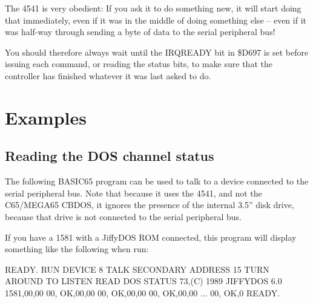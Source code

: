 The 4541 is very obedient: If you ask it to do something new, it
will start doing that immediately, even if it was in the middle of
doing something else -- even if it was half-way through sending a byte
of data to the serial peripheral bus!

You should therefore always wait until the IRQREADY bit in \$D697 is
set before issuing each command, or reading the status bits, to make
sure that the controller has finished whatever it was last asked to
do.

\section{Examples}

\subsection{Reading the DOS channel status}

The following BASIC65 program can be used to talk to a device
connected to the serial peripheral bus. Note that because it uses the
4541, and not the C65/MEGA65 CBDOS, it ignores the presence of the
internal 3.5'' disk drive, because that drive is not connected to the
serial peripheral bus.


If you have a 1581 with a JiffyDOS{\texttrademark} ROM connected, this
program will display something like the following when run:

\begin{screencode}
READY.
RUN
DEVICE 8 TALK
SECONDARY ADDRESS 15
TURN AROUND TO LISTEN
READ DOS STATUS
73,(C) 1989 JIFFYDOS 6.0 1581,00,00
00, OK,00,00
00, OK,00,00
00, OK,00,00
...
00, OK,0
READY.
\end{screencode}

